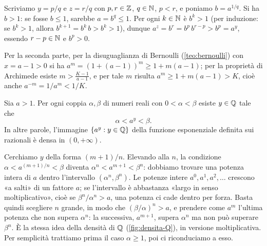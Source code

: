 \begin{dimostrazione}
Scriviamo $y=p/q$ e $z=r/q$ con $p,r\in\mathbb{Z}$, $q\in\mathbb{N}$, $p<r$, e poniamo $b=a^{1/q}$. Si ha
$b>1$: se fosse $b\le1$, sarebbe $a=b^{q}\le1$. Per ogni $k\in\mathbb{N}$ è $b^{k}>1$ (per
induzione: se $b^{k}>1$, allora $b^{k+1}=b^{k}\,b>b^{k}>1$), dunque
$a^{z}=b^{r}=b^{p}\,b^{r-p}>b^{p}=a^{y}$, essendo $r-p\in\mathbb{N}$ e $b^{p}>0$.

Per la seconda parte, per la disuguaglianza di Bernoulli (\cref{teo:bernoulli}) con
$x=a-1>0$ si ha $a^{m}=(1+(a-1))^{m}\ge1+m(a-1)$; per la proprietà di Archimede esiste
$m>\frac{K-1}{a-1}$, e per tale $m$ risulta $a^{m}\ge1+m(a-1)>K$, cioè anche
$a^{-m}=1/a^{m}<1/K$.
\end{dimostrazione}

\begin{lemma}[di densità]\label{lem:densita-esponenziale}
Sia $a>1$. Per ogni coppia $\alpha,\beta$ di numeri reali con $0<\alpha<\beta$ esiste
$y\in\mathbb{Q}$ tale che
\[
  \alpha<a^{y}<\beta .
\]
In altre parole, l'immagine $\{a^{y} : y\in\mathbb{Q}\}$ della funzione esponenziale definita
sui razionali è densa in $(0,+\infty)$.
\end{lemma}

\begin{schema}
\end{schema}

\begin{strategia}
Cerchiamo $y$ della forma $(m+1)/n$. Elevando alla $n$, la condizione
$\alpha<a^{(m+1)/n}<\beta$ diventa $\alpha^{n}<a^{m+1}<\beta^{n}$: dobbiamo trovare una
potenza intera di $a$ dentro l'intervallo $(\alpha^{n},\beta^{n})$. Le potenze intere
$a^{0},a^{1},a^{2},\dots$ crescono «a salti» di un fattore $a$; se l'intervallo è
abbastanza «largo in senso moltiplicativo», cioè se $\beta^{n}/\alpha^{n}>a$, una potenza
ci cade dentro per forza. Basta quindi scegliere $n$ grande, in modo che
$(\beta/\alpha)^{n}>a$, e prendere come $a^{m}$ l'ultima potenza che non supera
$\alpha^{n}$: la successiva, $a^{m+1}$, supera $\alpha^{n}$ ma non può superare
$\beta^{n}$. È la stessa idea della densità di $\mathbb{Q}$ (\cref{fig:densita-Q}), in versione
moltiplicativa. Per semplicità trattiamo prima il caso $\alpha\ge1$, poi ci riconduciamo
a esso.
\end{strategia}

